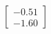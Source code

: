 \documentclass[preview]{standalone}
\begin{document}
\begin{align*}
\begin{bmatrix} -0.51 \\ -1.60 \end{bmatrix}
\end{align*}
\end{document}
